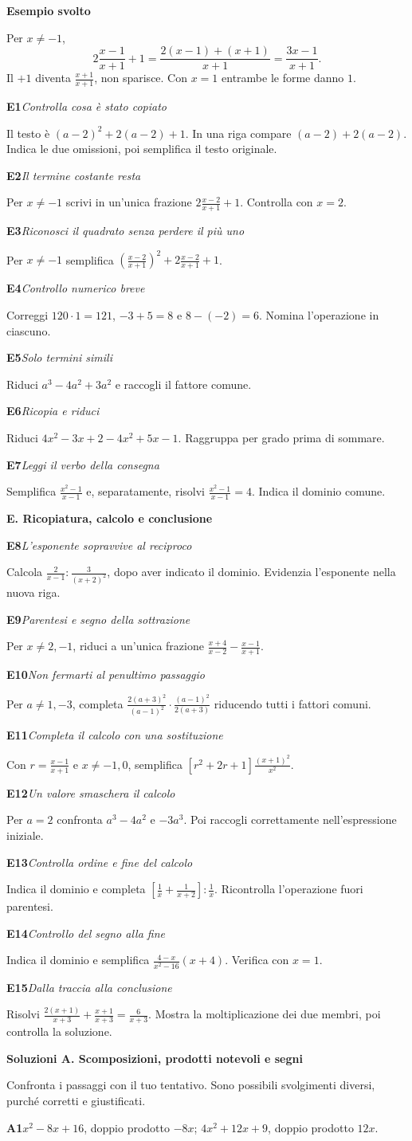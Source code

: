 \documentclass[11pt,a4paper]{article}
\newcommand{\tit}[1]{\par{\Large\bfseries\color{blu}#1}\par\smallskip}
\newcommand{\sott}[1]{\par\medskip{\large\bfseries\color{blu}#1}\par\smallskip}
\newcommand{\mini}[1]{\par\smallskip\textbf{#1}\par}
\newcommand{\nota}[1]{\par\smallskip\noindent\colorbox{blu!6}{\parbox{\dimexpr\linewidth-2\fboxsep\relax}{#1}}\par\smallskip}
\newcommand{\es}[3]{\Needspace{4\baselineskip}\par\medskip\textbf{\color{blu}#1}\quad\textit{#2}\par\nopagebreak #3\par}
\newcommand{\sol}[2]{\Needspace{3\baselineskip}\par\medskip\textbf{\color{verde}#1}\quad #2\par}
\begin{document}
\mini{Esempio svolto} Per $x\ne-1$,
\[2\frac{x-1}{x+1}+1=\frac{2(x-1)+(x+1)}{x+1}=\frac{3x-1}{x+1}.\]
Il $+1$ diventa $\frac{x+1}{x+1}$, non sparisce. Con $x=1$ entrambe le forme danno $1$.
\sott{Esercizi}
\es{E1}{Controlla cosa è stato copiato}{Il testo è $(a-2)^2+2(a-2)+1$. In una riga compare $(a-2)+2(a-2)$. Indica le due omissioni, poi semplifica il testo originale.}
\es{E2}{Il termine costante resta}{Per $x\ne-1$ scrivi in un’unica frazione $2\frac{x-2}{x+1}+1$. Controlla con $x=2$.}
\es{E3}{Riconosci il quadrato senza perdere il più uno}{Per $x\ne-1$ semplifica $\left(\frac{x-2}{x+1}\right)^2+2\frac{x-2}{x+1}+1$.}
\es{E4}{Controllo numerico breve}{Correggi $120\cdot1=121$, $-3+5=8$ e $8-(-2)=6$. Nomina l’operazione in ciascuno.}
\es{E5}{Solo termini simili}{Riduci $a^3-4a^2+3a^2$ e raccogli il fattore comune.}
\es{E6}{Ricopia e riduci}{Riduci $4x^2-3x+2-4x^2+5x-1$. Raggruppa per grado prima di sommare.}
\es{E7}{Leggi il verbo della consegna}{Semplifica $\frac{x^2-1}{x-1}$ e, separatamente, risolvi $\frac{x^2-1}{x-1}=4$. Indica il dominio comune.}
\clearpage
\tit{E. Ricopiatura, calcolo e conclusione}
\sott{Esercizi 8--15}
\es{E8}{L’esponente sopravvive al reciproco}{Calcola $\frac2{x-1}:\frac3{(x+2)^2}$, dopo aver indicato il dominio. Evidenzia l’esponente nella nuova riga.}
\es{E9}{Parentesi e segno della sottrazione}{Per $x\ne2,-1$, riduci a un’unica frazione $\frac{x+4}{x-2}-\frac{x-1}{x+1}$.}
\es{E10}{Non fermarti al penultimo passaggio}{Per $a\ne1,-3$, completa $\frac{2(a+3)^2}{(a-1)^2}\cdot\frac{(a-1)^2}{2(a+3)}$ riducendo tutti i fattori comuni.}
\es{E11}{Completa il calcolo con una sostituzione}{Con $r=\frac{x-1}{x+1}$ e $x\ne-1,0$, semplifica $[r^2+2r+1]\frac{(x+1)^2}{x^2}$.}
\es{E12}{Un valore smaschera il calcolo}{Per $a=2$ confronta $a^3-4a^2$ e $-3a^3$. Poi raccogli correttamente nell’espressione iniziale.}
\es{E13}{Controlla ordine e fine del calcolo}{Indica il dominio e completa $\left[\frac1x+\frac1{x+2}\right]:\frac1x$. Ricontrolla l’operazione fuori parentesi.}
\es{E14}{Controllo del segno alla fine}{Indica il dominio e semplifica $\frac{4-x}{x^2-16}(x+4)$. Verifica con $x=1$.}
\es{E15}{Dalla traccia alla conclusione}{Risolvi $\frac{2(x+1)}{x+3}+\frac{x+1}{x+3}=\frac6{x+3}$. Mostra la moltiplicazione dei due membri, poi controlla la soluzione.}
\clearpage
\tit{Soluzioni A. Scomposizioni, prodotti notevoli e segni}
\label{soluzioni}\nota{Confronta i passaggi con il tuo tentativo. Sono possibili svolgimenti diversi, purché corretti e giustificati.}
\sott{A1--A8}
\sol{A1}{$x^2-8x+16$, doppio prodotto $-8x$; $4x^2+12x+9$, doppio prodotto $12x$.}
\end{document}
